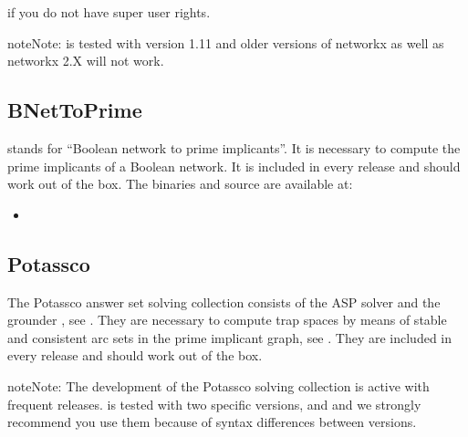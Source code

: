 \documentclass[letterpaper,10pt,english]{sphinxmanual}
\begin{document}
if you do not have super user rights.

\begin{sphinxadmonition}{note}{Note:}
 is tested with  version 1.11 and older versions of networkx as well as networkx 2.X will not work.
\end{sphinxadmonition}


\subsection{BNetToPrime}
\label{\detokenize{Installation:bnettoprime}}\label{\detokenize{Installation:installation-bnettoprime}}
 stands for “Boolean network to prime implicants”. It is necessary to compute the prime implicants of a Boolean network. It is included in every release and should work out of the box. The binaries and source are available at:
\begin{itemize}
\item {} 

\end{itemize}


\subsection{Potassco}
\label{\detokenize{Installation:installation-potassco}}\label{\detokenize{Installation:potassco}}
The Potassco answer set solving collection consists of the ASP solver  and the grounder , see {\hyperref[\detokenize{Bibliography:gebser2011}]{}}.
They are necessary to compute trap spaces by means of stable and consistent arc sets in the prime implicant graph, see {\hyperref[\detokenize{Bibliography:klarner2015trap}]{}}. They are included in every release and should work out of the box.

\begin{sphinxadmonition}{note}{Note:}
The development of the Potassco solving collection is active with frequent releases.
 is tested with two specific versions,  and  and we strongly recommend you use them because of syntax differences between versions.
\end{sphinxadmonition}
\end{document}
